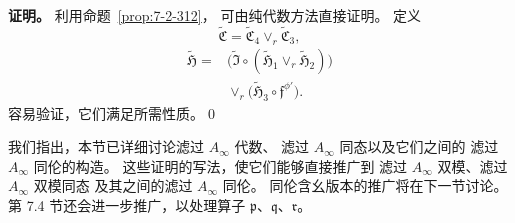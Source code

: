 \noindent\textbf{证明。}
利用命题~\ref{prop:7-2-312}，
可由纯代数方法直接证明。
定义
\begin{equation}
\widetilde{\mathfrak C}
=\widetilde{\mathfrak C}_4
\vee_r\widetilde{\mathfrak C}_3,
\tag{7.2.357}\label{eq:7-2-357}
\end{equation}
\begin{equation}
\begin{aligned}
\widetilde{\mathfrak H}
={}&\bigl(\widetilde{\mathfrak I}\circ
(\widetilde{\mathfrak H}_1
\vee_r\widetilde{\mathfrak H}_2)\bigr)\\
&\vee_r\bigl(\widetilde{\mathfrak H}_3
\circ\mathfrak f^{\phi'}\bigr).
\end{aligned}
\tag{7.2.358}\label{eq:7-2-358}
\end{equation}
容易验证，它们满足所需性质。\qed

我们指出，本节已详细讨论滤过 $A_\infty$ 代数、
滤过 $A_\infty$ 同态以及它们之间的
滤过 $A_\infty$ 同伦的构造。
这些证明的写法，使它们能够直接推广到
滤过 $A_\infty$ 双模、滤过 $A_\infty$ 双模同态
及其之间的滤过 $A_\infty$ 同伦。
同伦含幺版本的推广将在下一节讨论。
第 7.4 节还会进一步推广，以处理算子
$\mathfrak p$、$\mathfrak q$、$\mathfrak r$。
